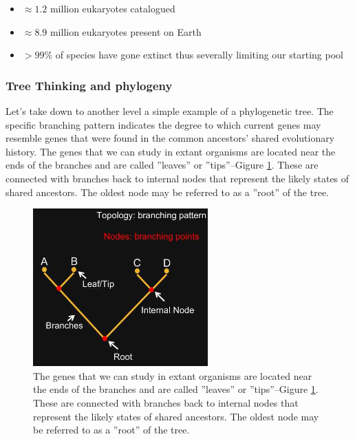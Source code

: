 \documentclass[]{article}
\begin{document}
\begin{itemize}
	\item $\approx 1.2$ million eukaryotes catalogued
	\item $\approx 8.9$ million eukaryotes present on Earth
	\item $>99\%$ of species have gone extinct thus severally limiting our starting pool
\end{itemize}

\subsubsection{Tree Thinking and phylogeny}


Let's take down to another level
a simple example of a phylogenetic tree.
The specific branching pattern
indicates the degree to which
current genes may resemble genes
that were found
in the common ancestors'
shared evolutionary history.
The genes that we can study
in extant organisms
are located near the ends of the branches
and are called ''leaves'' or ''tips''--Gigure \ref{fig:TreeTerminology}.
These are connected with branches
back to internal nodes
that represent the likely states
of shared ancestors.
The oldest node may be referred to
as a ''root'' of the tree.

\begin{figure}[H]
	\begin{center}
		\caption[Tree Terminology]{The genes that we can study
			in extant organisms
			are located near the ends of the branches
			and are called ''leaves'' or ''tips''--Gigure \ref{fig:TreeTerminology}.
			These are connected with branches
			back to internal nodes
			that represent the likely states
			of shared ancestors.
			The oldest node may be referred to
			as a ''root'' of the tree.}\label{fig:TreeTerminology}
		\includegraphics[width=0.6\textwidth]{TreeTerminology}
	\end{center}
\end{figure}
\end{document}
